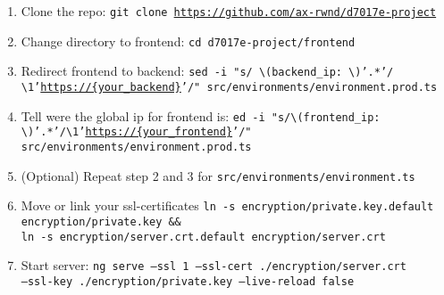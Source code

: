 \begin{enumerate}
    \item Clone the repo: \texttt{git clone \url{https://github.com/ax-rwnd/d7017e-project}}
    \item Change directory to frontend: \texttt{cd d7017e-project/frontend}
    \item Redirect frontend to backend: \texttt{sed -i "s/ \textbackslash (backend\_ip: \textbackslash )'.*'/ \\ \textbackslash 1'\url{https://{your\_backend}}'/" src/environments/environment.prod.ts}
    \item Tell were the global ip for frontend is: \texttt{ed -i "s/\textbackslash (frontend\_ip: \\ \textbackslash)'.*'/\textbackslash 1'\url{https://{your\_frontend}}'/" src/environments/environment.prod.ts}
    \item (Optional) Repeat step 2 and 3 for \texttt{src/environments/environment.ts}
    \item Move or link your ssl-certificates \texttt{ln -s encryption/private.key.default \\
    encryption/private.key \&\& \\
    ln -s encryption/server.crt.default encryption/server.crt}
    \item Start server: \texttt{ng serve --ssl 1 --ssl-cert ./encryption/server.crt \\
    --ssl-key ./encryption/private.key --live-reload false}
\end{enumerate}
